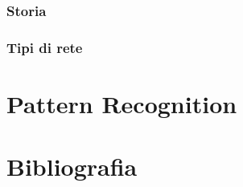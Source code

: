 \documentclass[a4paper,10pt]{book}
\begin{document}
\subsection{Storia}

\subsection{Tipi di rete}



\chapter{Pattern Recognition}








\chapter{Bibliografia}
\begin{thebibliography}{Bibliografia}
\end{thebibliography}

\appendix
\end{document}
